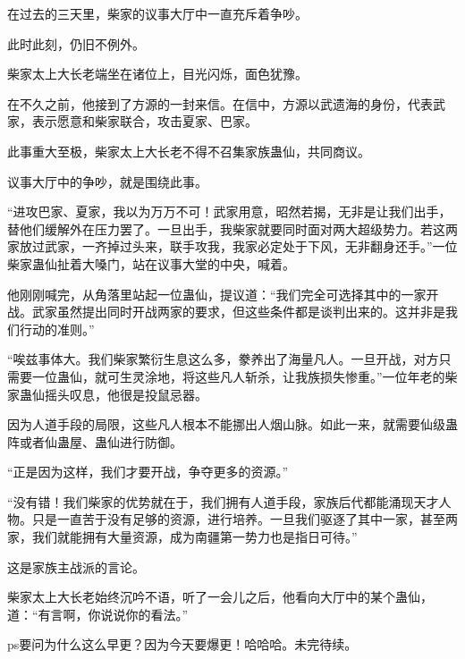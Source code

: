 \begin{this_body}
在过去的三天里，柴家的议事大厅中一直充斥着争吵。

此时此刻，仍旧不例外。

柴家太上大长老端坐在诸位上，目光闪烁，面色犹豫。

在不久之前，他接到了方源的一封来信。在信中，方源以武遗海的身份，代表武家，表示愿意和柴家联合，攻击夏家、巴家。

此事重大至极，柴家太上大长老不得不召集家族蛊仙，共同商议。

议事大厅中的争吵，就是围绕此事。

“进攻巴家、夏家，我以为万万不可！武家用意，昭然若揭，无非是让我们出手，替他们缓解外在压力罢了。一旦出手，我柴家就要同时面对两大超级势力。若这两家放过武家，一齐掉过头来，联手攻我，我家必定处于下风，无非翻身还手。”一位柴家蛊仙扯着大嗓门，站在议事大堂的中央，喊着。

他刚刚喊完，从角落里站起一位蛊仙，提议道：“我们完全可选择其中的一家开战。武家虽然提出同时开战两家的要求，但这些条件都是谈判出来的。这并非是我们行动的准则。”

“唉兹事体大。我们柴家繁衍生息这么多，豢养出了海量凡人。一旦开战，对方只需要一位蛊仙，就可生灵涂地，将这些凡人斩杀，让我族损失惨重。”一位年老的柴家蛊仙摇头叹息，他很是投鼠忌器。

因为人道手段的局限，这些凡人根本不能挪出人烟山脉。如此一来，就需要仙级蛊阵或者仙蛊屋、蛊仙进行防御。

“正是因为这样，我们才要开战，争夺更多的资源。”

“没有错！我们柴家的优势就在于，我们拥有人道手段，家族后代都能涌现天才人物。只是一直苦于没有足够的资源，进行培养。一旦我们驱逐了其中一家，甚至两家，我们就能拥有大量资源，成为南疆第一势力也是指日可待。”

这是家族主战派的言论。

柴家太上大长老始终沉吟不语，听了一会儿之后，他看向大厅中的某个蛊仙，道：“有言啊，你说说你的看法。”

ps要问为什么这么早更？因为今天要爆更！哈哈哈。未完待续。

\end{this_body}

